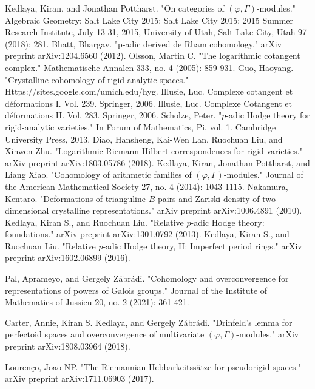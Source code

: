 \documentclass[11pt]{report}
\begin{document}

\begin{thebibliography}{1}
 Kedlaya, Kiran, and Jonathan Pottharst. "On categories of $(\varphi,\Gamma)$-modules." Algebraic Geometry: Salt Lake City 2015: Salt Lake City 2015: 2015 Summer Research Institute, July 13-31, 2015, University of Utah, Salt Lake City, Utah 97 (2018): 281.
 Bhatt, Bhargav. "p-adic derived de Rham cohomology." arXiv preprint arXiv:1204.6560 (2012). 
 Olsson, Martin C. "The logarithmic cotangent complex." Mathematische Annalen 333, no. 4 (2005): 859-931.
 Guo, Haoyang. "Crystalline cohomology of rigid analytic spaces." Https://sites.google.com/umich.edu/hyg.
 Illusie, Luc. Complexe cotangent et d\'eformations I. Vol. 239. Springer, 2006.
 Illusie, Luc. Complexe Cotangent et d\'eformations II. Vol. 283. Springer, 2006.
 Scholze, Peter. "$ p $-adic Hodge theory for rigid-analytic varieties." In Forum of Mathematics, Pi, vol. 1. Cambridge University Press, 2013.
 Diao, Hansheng, Kai-Wen Lan, Ruochuan Liu, and Xinwen Zhu. "Logarithmic Riemann-Hilbert correspondences for rigid varieties." arXiv preprint arXiv:1803.05786 (2018).
 Kedlaya, Kiran, Jonathan Pottharst, and Liang Xiao. "Cohomology of arithmetic families of $(\varphi,\Gamma)$-modules." Journal of the American Mathematical Society 27, no. 4 (2014): 1043-1115.
 Nakamura, Kentaro. "Deformations of trianguline $B$-pairs and Zariski density of two dimensional crystalline representations." arXiv preprint arXiv:1006.4891 (2010).
 Kedlaya, Kiran S., and Ruochuan Liu. "Relative $p$-adic Hodge theory: foundations." arXiv preprint arXiv:1301.0792 (2013).
 Kedlaya, Kiran S., and Ruochuan Liu. "Relative $p$-adic Hodge theory, II: Imperfect period rings." arXiv preprint arXiv:1602.06899 (2016).

 Pal, Aprameyo, and Gergely Z\'abr\'adi. "Cohomology and overconvergence for representations of powers of Galois groups." Journal of the Institute of Mathematics of Jussieu 20, no. 2 (2021): 361-421.

 Carter, Annie, Kiran S. Kedlaya, and Gergely Z\'abr\'adi. "Drinfeld's lemma for perfectoid spaces and overconvergence of multivariate $(\varphi, \Gamma)$-modules." arXiv preprint arXiv:1808.03964 (2018). 

 Louren\c{c}o, Joao NP. "The Riemannian Hebbarkeitss\"atze for pseudorigid spaces." arXiv preprint arXiv:1711.06903 (2017).


\end{thebibliography}
\end{document}
